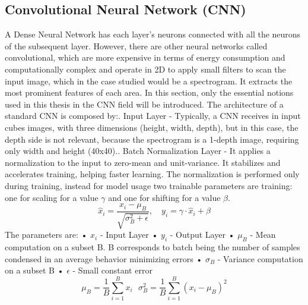 \subsection{Convolutional Neural Network (CNN)}
A Dense Neural Network has each layer's neurons connected with all the neurons of the subsequent layer. However, there are other neural networks called convolutional, which are more expensive in terms of energy consumption and computationally complex and operate in 2D to apply small filters to scan the input image, which in the case studied would be a spectrogram. It extracts the most prominent features of each area.\newline 
In this section, only the essential notions used in this thesis in the CNN field will be introduced.\newline
The architecture of a standard CNN\cite{introduction_CNN} is composed by:\newline{}. Input Layer - Typically, a CNN receives in input cubes images, with three dimensions (height, width, depth), but in this case, the depth side is not relevant, because the spectrogram is a 1-depth image, requiring only width and height (40x40).. Batch Normalization Layer - It applies a normalization to the input to zero-mean and unit-variance. It stabilizes and accelerates training, helping faster learning. The normalization is performed only during training, instead for model usage two trainable parameters are training: one for scaling for a value $\gamma$ and one for shifting for a value $\beta$.\newline
\begin{equation}
    \hat{x}_i = \frac{x_i - \mu_B}{\sqrt{\sigma_B^2 + \epsilon}}, \quad
    y_i = \gamma \cdot \hat{x}_i + \beta
\end{equation}
The parameters are:\newline
• $x_i$ - Input Layer\newline
• $y_i$ - Output Layer\newline
• $\mu_B$ - Mean computation on a subset B. B corresponds to batch being the number of samples condensed in an average behavior minimizing errors\newline
• $\sigma_B$ - Variance computation on a subset B\newline
• $\epsilon$ - Small constant error\newline
\begin{equation}
    \mu_B=\frac{1}{B}\sum_{i=1}^{B}x_i\,\,\,\,\sigma_B^2=\frac{1}{B}\sum_{i=1}^{B}(x_i-\mu_B)^2
\end{equation}
